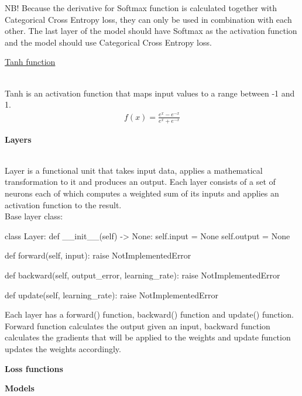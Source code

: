 \documentclass{article}
\begin{document}
    NB! Because the derivative for Softmax function is calculated 
    together with Categorical Cross Entropy loss, they can only be 
    used in combination with each other. The last layer of the model
    should have Softmax as the activation function and the model should 
    use Categorical Cross Entropy loss. \\
    \pagebreak

    \hypertarget{tanh}{\underline{Tanh function}} \\

    Tanh is an activation function that maps input values to a range 
    between -1 and 1.
    \begin{align*}
        f(x) = \frac{e^{x} - e^{-x}}{e^{x} + e^{-x}}
    \end{align*}

    \begin{center}    
        \end{center}
    \clearpage

    \hypertarget{layers}{\textbf{Layers}} \\

    Layer is a functional unit that takes input data, applies a 
    mathematical transformation to it and produces an output. Each layer 
    consists of a set of neurons each of which computes a weighted sum of 
    its inputs and applies an activation function to the result. \\

    Base layer class:
    \begin{python}
class Layer:
    def __init__(self) -> None:
        self.input = None
        self.output = None

    def forward(self, input):
        raise NotImplementedError

    def backward(self, output_error, learning_rate):
        raise NotImplementedError

    def update(self, learning_rate):
        raise NotImplementedError
    \end{python}
    Each layer has a forward() function, backward() function and update() function. Forward function
    calculates the output given an input, backward function calculates the gradients that will be applied to 
    the weights and update function updates the weights accordingly.
    \clearpage

    \hypertarget{losses}{\textbf{Loss functions}}
    \clearpage

    \hypertarget{models}{\textbf{Models}}
    \clearpage
\end{document}
